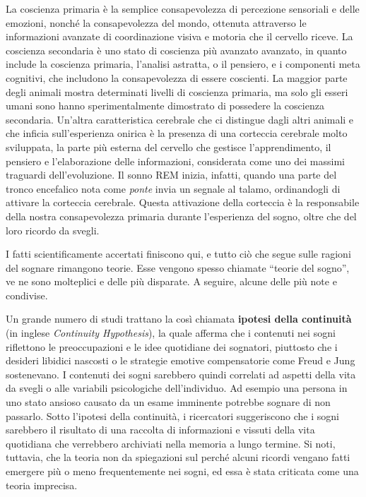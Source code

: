 La coscienza primaria è la semplice consapevolezza di percezione sensoriali e delle emozioni, nonché la consapevolezza
del mondo, ottenuta attraverso le informazioni avanzate di coordinazione visiva e motoria che il cervello riceve.
La coscienza secondaria è uno stato di coscienza più avanzato avanzato, in quanto include la coscienza primaria,
l'analisi astratta, o il pensiero, e i componenti meta cognitivi, che includono la consapevolezza di essere coscienti.
La maggior parte degli animali mostra determinati livelli di coscienza primaria, ma solo gli esseri umani sono
hanno sperimentalmente dimostrato di possedere la coscienza secondaria.
Un'altra caratteristica cerebrale che ci distingue dagli altri animali e che inficia sull'esperienza
onirica è la presenza di una corteccia cerebrale molto sviluppata, la parte più esterna del cervello che
gestisce l'apprendimento, il pensiero e l'elaborazione delle informazioni, considerata come uno dei massimi
traguardi dell'evoluzione.
Il sonno REM inizia, infatti, quando una parte del tronco encefalico nota come \textit{ponte} invia un segnale al
talamo, ordinandogli di attivare la corteccia cerebrale.
Questa attivazione della corteccia è la responsabile della nostra consapevolezza primaria durante l'esperienza del
sogno, oltre che del loro ricordo da svegli. \newline

I fatti scientificamente accertati finiscono qui, e tutto ciò che segue sulle ragioni del sognare rimangono teorie.
Esse vengono spesso chiamate ``teorie del sogno'', ve ne sono molteplici e delle più disparate.
A seguire, alcune delle più note e condivise.


Un grande numero di studi trattano la così chiamata \textbf{ipotesi della continuità} (in inglese
\textit{Continuity Hypothesis}), la quale afferma che i contenuti nei sogni riflettono le preoccupazioni
e le idee quotidiane dei sognatori, piuttosto che i desideri libidici nascosti o le strategie emotive compensatorie
come Freud e Jung sostenevano.
I contenuti dei sogni sarebbero quindi correlati ad aspetti della vita da svegli o alle variabili psicologiche
dell'individuo.
Ad esempio una persona in uno stato ansioso causato da un esame imminente potrebbe sognare di non passarlo.
Sotto l'ipotesi della continuità, i ricercatori suggeriscono che i sogni sarebbero il risultato di una raccolta di
informazioni e vissuti della vita quotidiana che verrebbero archiviati nella memoria a lungo termine.
Si noti, tuttavia, che la teoria non da spiegazioni sul perché alcuni ricordi vengano
fatti emergere più o meno frequentemente nei sogni, ed essa è stata criticata come una teoria imprecisa.

